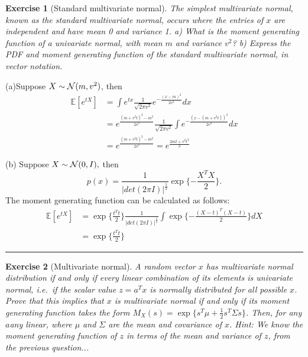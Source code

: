 \documentclass[twoside]{article}
\newcounter{lecnum}
\newtheorem{exercise}{Exercise}[lecnum]
\newenvironment{proof}{{\bf Proof:}}{\hfill\rule{2mm}{2mm}}
\newcommand\E{\mathbb{E}}
\begin{document}
\begin{exercise}[Standard multivariate normal]
  The simplest multivariate normal, known as the standard multivariate normal, occurs where the entries of $x$ are independent and have mean 0 and variance 1. a) What is the moment generating function of a univariate normal, with mean $m$ and variance $v^2$? b) Express the PDF and moment generating function of the standard multivariate normal, in vector notation.
\end{exercise}

\begin{proof}
(a)Suppose $X\sim {\cal N}(m, v^2)$, then
\begin{equation}
\begin{split}\label{mgf}
\E[e^{tX}] &= \int e^{tx}\frac{1}{\sqrt{2\pi v^2}}e^{-\frac{(x-m)^2}{2v^2}}dx\\
&= e^{\frac{(m+v^2t)^2-m^2}{2v^2}}\frac{1}{\sqrt{2\pi v^2}}\int e^{-\frac{(x-(m+v^2t))^2}{2v^2}}dx\\
&= e^{\frac{(m+v^2t)^2-m^2}{2v^2}} = e^{\frac{2mt+v^2t^2}{2}}
\end{split}
\end{equation}

(b)
Suppose $X\sim {\cal N}(0, I),$ then 
$$p(x) = \frac{1}{|det(2\pi I)|^{\frac 12}}\exp \{-\frac{X^TX}{2}\}.$$
The moment generating function can be calculated as follows:
\begin{equation}
\begin{split}
\E[e^{tX}] &=  \exp\{\frac{t^Tt}{2}\}\frac{1}{|det(2\pi I)|^{\frac 12}}\int \exp \{-\frac{(X-t)^T(X-t)}{2}\}dX\\
&= \exp\{\frac{t^Tt}{2}\}
\end{split}
\end{equation}


\end{proof}

\begin{exercise}[Multivariate normal]
  A random vector $x$ has multivariate normal distribution if and only if every linear combination of its elements is univariate normal, i.e.\ if the scalar value $z = a^Tx$ is normally distributed for all possible $x$. Prove that this implies that $x$ is multivariate normal if and only if its moment generating function takes the form $M_X(s) = \exp\{s^T\mu + \frac 12 s^T\Sigma s\}$. Then, for any $a$any linear, where $\mu$ and $\Sigma$ are the mean and covariance of $x$. \textit{Hint: We know the moment generating function of $z$ in terms of the mean and variance of $z$, from the previous question...}
\end{exercise}
    
\end{document}
